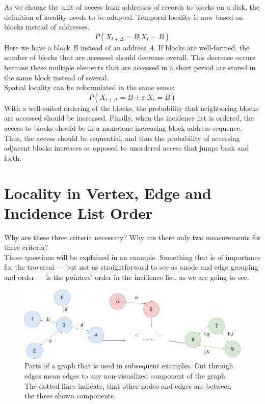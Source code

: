     As we change the unit of access from addresses of records to blocks on a disk, the definition of locality needs to be adapted.
    Temporal locality is now based on blocks instead of addresses.
     \[ P (X_{t + \Delta} = B | X_t = B) \]
     Here we have a block $B$ instead of an address $A$. 
     If blocks are well-formed, the number of blocks that are accessed should decrease overall.
     This decrease occurs because these multiple elements that are accessed in a short period are stored in the same block instead of several. \\
     Spatial locality can be reformulated in the same sense:
      \[ P(X_{t + \Delta} = B \pm \varepsilon | X_t = B) \]
      With a well-suited ordering of the blocks, the probability that neighboring blocks are accessed should be increased.
      Finally, when the incidence list is ordered, the access to blocks should be in a monotone increasing block address sequence. 
      Thus, the access should be sequential, and thus the probability of accessing adjacent blocks increases as opposed to unordered access that jumps back and forth.
    
\section{Locality in Vertex, Edge and Incidence List Order}
  Why are these three criteria necessary? Why are there only two measurements for three criteria? \\
  Those questions will be explained in an example.
  Something that is of importance for the traversal --- but not as straightforward to see as anode and edge grouping and order --- is the pointers' order in the incidence list, as we are going to see.
  
  \begin{figure}[htp]
    \begin{center}
        \includegraphics[keepaspectratio,height=0.3\textheight,width=\textwidth]{img/05-problem_def/example_graph.png}
    \end{center}
    \caption{Parts of a graph that is used in subsequent examples. Cut through edges mean edges to any non-visualized component of the graph. The dotted lines indicate, that other nodes and edges are between the three shown components.}
    \label{ex-gr}
  \end{figure}
  
